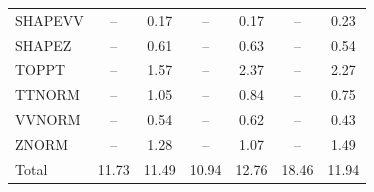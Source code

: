 \begin{table}[H]
\begin{center}
\begin{footnotesize}
\begin{tabular}{lcccccc}
				SHAPEVV & -- &  0.17 & -- &  0.17 & -- &  0.23 \\
				SHAPEZ & -- &  0.61 & -- &  0.63 & -- &  0.54 \\
				TOPPT & -- &  1.57 & -- &  2.37 & -- &  2.27 \\
				TTNORM & -- &  1.05 & -- &  0.84 & -- &  0.75 \\
				VVNORM & -- &  0.54 & -- &  0.62 & -- &  0.43 \\
				ZNORM & -- &  1.28 & -- &  1.07 & -- &  1.49 \\
				Total &  11.73  &  11.49 &  10.94  &  12.76 &  18.46  &  11.94 \\ \hline \hline
			\end{tabular}
			\label{tab:SysUncertainties_1200}
        \end{footnotesize}
	\end{center}
\end{table}


